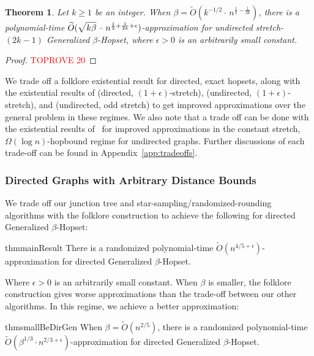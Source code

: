 \documentclass{article}
\newtheorem{theorem}{Theorem}[section]
\theoremstyle{definition}
\theoremstyle{remark}
\def\be    {\beta}
\def\hopset {{\sc Generalized $\beta$-Hopset}}
\begin{document}
\begin{theorem} \label{thm:undir_gen_stretch}
    Let $k \geq 1$ be an integer. When $\be = \widetilde{O}(k^{-1/2} \cdot \, n^{\frac{1}{2} - \frac{1}{2k}}) $, there is a polynomial-time $\widetilde{O}(\sqrt{k \be \vphantom{\be^k}} \, \cdot \, n^{\frac{1}{2} + \frac{1}{2k} + \epsilon})$-approximation for undirected stretch-$(2k-1)$ {\hopset}, where $\epsilon > 0$ is an arbitrarily small constant.
\end{theorem}
\begin{proof}\textcolor{red}{TOPROVE 20}\end{proof}

\else 
We trade off a folklore existential result for directed, exact hopsets, along with the existential results of \cite{BW23} (directed, $(1+\epsilon)$-stretch), \cite{elkin2019RNC} (undirected, $(1+\epsilon)$-stretch), and \cite{TZ05} (undirected, odd stretch) to get improved approximations over the general problem in these regimes. We also note that a trade off can be done with the existential results of~\cite{BP2020} for improved approximations in the constant stretch, $\Omega(\log n)$-hopbound regime for undirected graphs. Further discussions of each trade-off can be found in Appendix~\ref{app:tradeoffs}.

\subsubsection{Directed Graphs with Arbitrary Distance Bounds}
We trade off our junction tree and star-sampling/randomized-rounding algorithms with the folklore construction to achieve the following for directed {\hopset}:
\begin{restatable}{thm}{mainResult}
\label{thm:main_result}
    There is a randomized  polynomial-time $\widetilde{O}(n^{4/5 + \epsilon})$-approximation for directed {\hopset}.
\end{restatable}

Where $\epsilon > 0$ is an arbitrarily small constant. When $\beta$ is smaller, the folklore construction gives worse approximations than the trade-off between our other algorithms. In this regime, we achieve a better approximation:
\begin{restatable}{thm}{smallBeDirGen} \label{thm:small_be_dir_gen}
    When $\be = \widetilde{O}(n^{2/5})$, there is a randomized polynomial-time $\widetilde{O}(\be^{1/3} \cdot n^{2/3 + \epsilon})$-approximation for directed {\hopset}.
\end{restatable}
 
\end{document}
